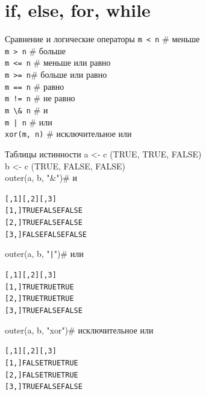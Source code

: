 \section{if, else, for, while}
\begin{frame}{Сравнение и логические операторы}
\footnotesize \verb"m < n" \normalsize \hfill \# меньше \\ \vfill
\footnotesize \verb"m > n" \normalsize \hfill \# больше\\ \vfill
\footnotesize \verb"m <= n" \normalsize \hfill \# меньше или равно\\ \vfill
\footnotesize \verb"m >= n"\normalsize  \hfill \# больше или равно\\ \vfill
\footnotesize \verb"m == n" \normalsize \hfill \# равно\\ \vfill
\footnotesize \verb"m != n" \normalsize \hfill \# не равно\\ \vfill
\footnotesize \verb"m \& n" \normalsize \hfill \# и\\ \vfill
\footnotesize \verb"m | n" \normalsize \hfill \# или\\ \vfill
\footnotesize \verb"xor(m, n)" \normalsize \hfill \# исключительное или\\
\end{frame}
\begin{frame}[fragile]{Таблицы истинности}
a <- c (TRUE, TRUE, FALSE)\\
b <- c (TRUE, FALSE, FALSE)\\
outer(a, b, "\&")\hfill \# и\\
\footnotesize 
\begin{alltt}
      [,1]  [,2]  [,3]
[1,]  TRUE FALSE FALSE
[2,]  TRUE FALSE FALSE
[3,] FALSE FALSE FALSE
\end{alltt}
\normalsize
outer(a, b, "\verb,|,")\hfill \# или\\
\footnotesize 
\begin{alltt}
     [,1]  [,2]  [,3]
[1,] TRUE  TRUE  TRUE
[2,] TRUE  TRUE  TRUE
[3,] TRUE FALSE FALSE
\end{alltt}
\normalsize
outer(a, b, "xor")\hfill \# исключительное или\\
\footnotesize 
\begin{alltt}
      [,1]  [,2]  [,3]
[1,] FALSE  TRUE  TRUE
[2,] FALSE  TRUE  TRUE
[3,]  TRUE FALSE FALSE
\end{alltt}
\normalsize
\end{frame}
